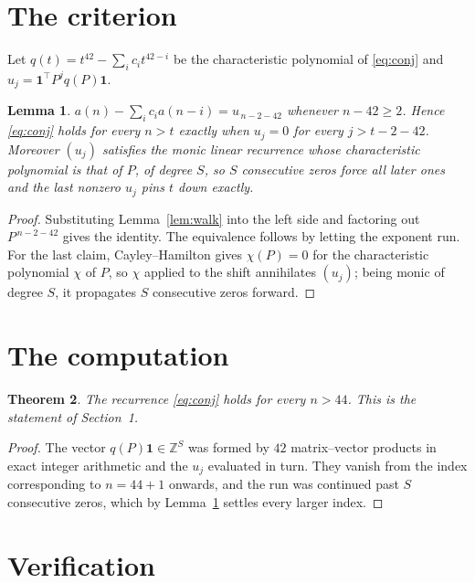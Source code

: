 \documentclass[11pt,a4paper]{article}
\theoremstyle{plain}
\newtheorem{theorem}{Theorem}
\newtheorem{lemma}[theorem]{Lemma}
\theoremstyle{definition}
\begin{document}
\section{The criterion}

Let $q(t)=t^{42}-\sum_i c_i t^{42-i}$ be the characteristic polynomial of
\eqref{eq:conj} and $u_j=\mathbf{1}^{\!\top}P^{j}q(P)\mathbf{1}$.

\begin{lemma}\label{lem:crit}
$a(n)-\sum_i c_i a(n-i)=u_{\,n-2-42}$ whenever $n-42\ge2$. Hence
\eqref{eq:conj} holds for every $n>t$ exactly when $u_j=0$ for every
$j>t-2-42$. Moreover $(u_j)$ satisfies the monic linear recurrence whose
characteristic polynomial is that of $P$, of degree $S$, so $S$ consecutive zeros force all
later ones and the last nonzero $u_j$ pins $t$ down exactly.
\end{lemma}

\begin{proof}
Substituting Lemma~\ref{lem:walk} into the left side and factoring out
$P^{\,n-2-42}$ gives the identity. The equivalence follows by letting the exponent
run. For the last claim, Cayley--Hamilton gives $\chi(P)=0$ for the characteristic
polynomial $\chi$ of $P$, so $\chi$ applied to the shift annihilates $(u_j)$; being monic of
degree $S$, it propagates $S$ consecutive zeros forward.
\end{proof}

\section{The computation}

\begin{theorem}
The recurrence \eqref{eq:conj} holds for every $n>44$. This is the statement of
Section~1.
\end{theorem}

\begin{proof}
The vector $q(P)\mathbf{1}\in\mathbb{Z}^{S}$ was formed by $42$ matrix--vector
products in exact integer arithmetic and the $u_j$ evaluated in turn. They vanish from the
index corresponding to $n=44+1$ onwards, and the run was continued past $S$ consecutive
zeros, which by Lemma~\ref{lem:crit} settles every larger index.
\end{proof}

\section{Verification}
\end{document}
